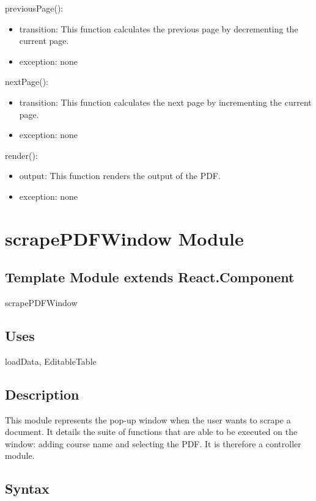 \documentclass[12pt, titlepage]{article}
\begin{document}
\noindent previousPage():
\begin{itemize}
\item transition: This function calculates the previous page by decrementing the current page.
\item exception: none
\end{itemize}

\noindent nextPage():
\begin{itemize}
\item transition: This function calculates the next page by incrementing the current page.
\item exception: none
\end{itemize}

\noindent render():
\begin{itemize}
\item output: This function renders the output of the PDF.
\item exception: none
\end{itemize}

\newpage

\section{scrapePDFWindow Module}

\subsection{Template Module extends React.Component}

scrapePDFWindow

\subsection{Uses}

loadData, EditableTable

\subsection{Description}
This module represents the pop-up window when the user wants to scrape a document. It details the suite of functions that are able to be executed on the window: adding course name and selecting the PDF. It is therefore a controller module.

\subsection{Syntax}
\end{document}

